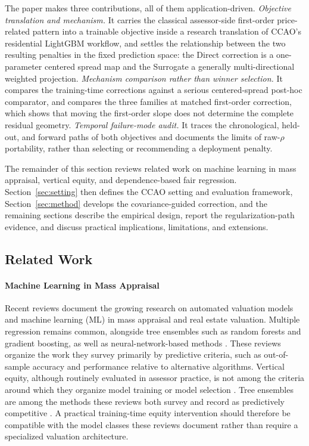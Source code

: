 \documentclass[10pt]{article}
\theoremstyle{definition}
\newcommand{\1}{\mathbf{1}}
\begin{document}
{The paper makes three contributions, all of them application-driven. \emph{Objective translation and mechanism.} It carries the classical assessor-side first-order price-related pattern
into a trainable objective inside a research translation of CCAO's residential LightGBM workflow, and settles the relationship between the two resulting penalties in the fixed prediction space: the Direct correction is a one-parameter centered spread map and the Surrogate a generally multi-directional weighted projection. \emph{Mechanism comparison rather than winner selection.} It compares the training-time corrections against a serious centered-spread post-hoc comparator, and compares the three families at matched first-order correction, which shows that moving the first-order slope does not determine the complete residual geometry. \emph{Temporal failure-mode audit.} It traces the chronological, held-out, and forward paths of both objectives and documents the limits of raw-$\rho$ portability, rather than selecting or recommending a deployment penalty.}

The remainder of this section reviews related work on machine learning in mass appraisal, vertical equity, and dependence-based fair regression. Section~\ref{sec:setting} then defines the CCAO setting and evaluation framework, Section~\ref{sec:method} develops the covariance-guided correction, and the remaining sections describe the empirical design, report the regularization-path evidence, and discuss practical implications, limitations, and extensions.


\subsection{Related Work}
\label{subsec:related_work}

\paragraph{Machine Learning in Mass Appraisal}
Recent reviews document the {growing research on} automated valuation models and machine learning (ML) in mass appraisal and {real estate} valuation. {Multiple regression remains common, alongside tree ensembles such as random forests and gradient boosting, as well as neural-network-based methods} \cite{WangLi2019,Rootetal2023,Zilli2024,purdueAssessingTechniques}. These reviews organize the work they survey primarily by predictive criteria, such as out-of-sample accuracy and performance relative to alternative algorithms. Vertical equity, although routinely evaluated in assessor practice, is not among the criteria around which they organize model training or model selection \cite{WangLi2019,Rootetal2023,Zilli2024}. Tree ensembles are among the methods these reviews both survey and record as predictively competitive \cite{Rootetal2023,Sevgen2024100111,Zilli2024}. A practical training-time equity intervention should therefore be compatible with the model classes these reviews document rather than require a specialized valuation architecture.
\end{document}
